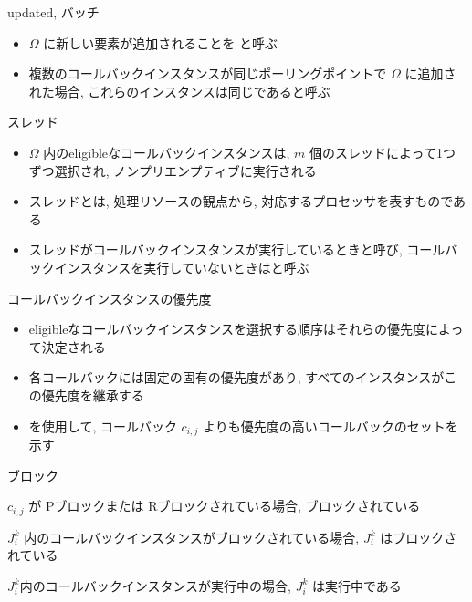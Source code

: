 \begin{frame}{updated, バッチ}
    \begin{itemize}
        \item $\Omega$ に新しい要素が追加されることを  と呼ぶ
        \item 複数のコールバックインスタンスが同じポーリングポイントで $\Omega$ に追加された場合, これらのインスタンスは同じであると呼ぶ
    \end{itemize}
\end{frame}

\begin{frame}{スレッド}
    \begin{itemize}
        \item $\Omega$ 内のeligibleなコールバックインスタンスは, $m$ 個のスレッドによって1つずつ選択され, ノンプリエンプティブに実行される
        \item スレッドとは, 処理リソースの観点から, 対応するプロセッサを表すものである
        \item スレッドがコールバックインスタンスが実行しているときと呼び, コールバックインスタンスを実行していないときはと呼ぶ
    \end{itemize}
\end{frame}

\begin{frame}{コールバックインスタンスの優先度}
    \begin{itemize}
        \item eligibleなコールバックインスタンスを選択する順序はそれらの優先度によって決定される
        \item 各コールバックには固定の固有の優先度があり, すべてのインスタンスがこの優先度を継承する
        \item {} を使用して, コールバック $c_{i, j}$ よりも優先度の高いコールバックのセットを示す
    \end{itemize}
\end{frame}

\begin{frame}{ブロック}
    \begin{definition}
        $c_{i, j}$ が Pブロックまたは Rブロックされている場合, ブロックされている
    \end{definition}
    \begin{definition}
        $J_{i}^{k}$ 内のコールバックインスタンスがブロックされている場合, $J_{i}^{k}$ はブロックされている
    \end{definition}
    \begin{definition}
        $J_{i}^{k}$内のコールバックインスタンスが実行中の場合, $J_{i}^{k}$ は実行中である
    \end{definition}
\end{frame}

